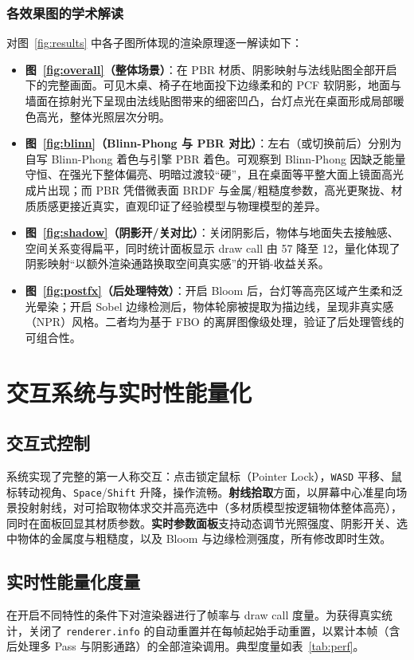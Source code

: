 \documentclass[11pt, a4paper, oneside]{report}
\newcommand{\keyword}[1]{\textbf{#1}}
\newcommand{\code}[1]{\texttt{#1}}
\begin{document}
\subsection{各效果图的学术解读}
对图~\ref{fig:results} 中各子图所体现的渲染原理逐一解读如下：
\begin{itemize}
    \item \keyword{图~\ref{fig:overall}（整体场景）}：在 PBR 材质、阴影映射与法线贴图全部开启下的完整画面。可见木桌、椅子在地面投下边缘柔和的 PCF 软阴影，地面与墙面在掠射光下呈现由法线贴图带来的细密凹凸，台灯点光在桌面形成局部暖色高光，整体光照层次分明。
    \item \keyword{图~\ref{fig:blinn}（Blinn-Phong 与 PBR 对比）}：左右（或切换前后）分别为自写 Blinn-Phong 着色与引擎 PBR 着色。可观察到 Blinn-Phong 因缺乏能量守恒、在强光下整体偏亮、明暗过渡较“硬”，且在桌面等平整大面上镜面高光成片出现；而 PBR 凭借微表面 BRDF 与金属/粗糙度参数，高光更聚拢、材质质感更接近真实，直观印证了经验模型与物理模型的差异。
    \item \keyword{图~\ref{fig:shadow}（阴影开/关对比）}：关闭阴影后，物体与地面失去接触感、空间关系变得扁平，同时统计面板显示 draw call 由 57 降至 12，量化体现了阴影映射“以额外渲染通路换取空间真实感”的开销-收益关系。
    \item \keyword{图~\ref{fig:postfx}（后处理特效）}：开启 Bloom 后，台灯等高亮区域产生柔和泛光晕染；开启 Sobel 边缘检测后，物体轮廓被提取为描边线，呈现非真实感（NPR）风格。二者均为基于 FBO 的离屏图像级处理，验证了后处理管线的可组合性。
\end{itemize}

\chapter{交互系统与实时性能量化}

\section{交互式控制}
系统实现了完整的第一人称交互：点击锁定鼠标（Pointer Lock），\code{WASD} 平移、鼠标转动视角、\code{Space}/\code{Shift} 升降，操作流畅。\keyword{射线拾取}方面，以屏幕中心准星向场景投射射线，对可拾取物体求交并高亮选中（多材质模型按逻辑物体整体高亮），同时在面板回显其材质参数。\keyword{实时参数面板}支持动态调节光照强度、阴影开关、选中物体的金属度与粗糙度，以及 Bloom 与边缘检测强度，所有修改即时生效。

\section{实时性能量化度量}
在开启不同特性的条件下对渲染器进行了帧率与 draw call 度量。为获得真实统计，关闭了 \code{renderer.info} 的自动重置并在每帧起始手动重置，以累计本帧（含后处理多 Pass 与阴影通路）的全部渲染调用。典型度量如表~\ref{tab:perf}。
\end{document}
